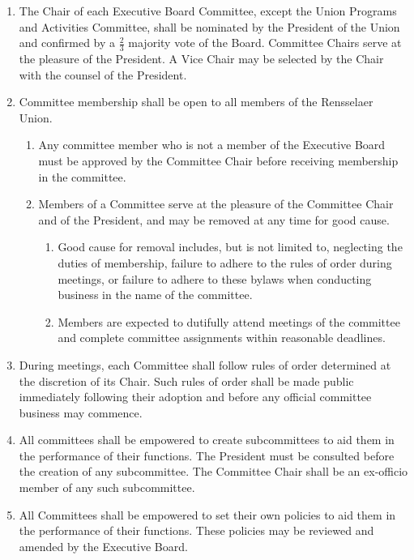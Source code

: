 \begin{enumerate}

    \item The Chair of each Executive Board Committee, except the Union Programs and Activities Committee, shall be nominated by the President of the Union and confirmed by a $\frac{2}{3}$ majority vote of the Board. Committee Chairs serve at the pleasure of the President. A Vice Chair may be selected by the Chair with the counsel of the President.

    \item Committee membership shall be open to all members of the Rensselaer Union.
    \begin{enumerate}
        \item Any committee member who is not a member of the Executive Board must be approved by the Committee Chair before receiving membership in the committee.
        \item Members of a Committee serve at the pleasure of the Committee Chair and of the President, and may be removed at any time for good cause.
        \begin{enumerate}
            \item Good cause for removal includes, but is not limited to, neglecting the duties of membership, failure to adhere to the rules of order during meetings, or failure to adhere to these bylaws when conducting business in the name of the committee.
            \item Members are expected to dutifully attend meetings of the committee and complete committee assignments within reasonable deadlines.
        \end{enumerate}
    \end{enumerate}
    
    \item During meetings, each Committee shall follow rules of order determined at the discretion of its Chair. Such rules of order shall be made public immediately following their adoption and before any official committee business may commence.

    \item All committees shall be empowered to create subcommittees to aid them in the performance of their functions. The President must be consulted before the creation of any subcommittee. The Committee Chair shall be an ex-officio member of any such subcommittee.

    \item All Committees shall be empowered to set their own policies to aid them in the performance of their functions. These policies may be reviewed and amended by the Executive Board.


\end{enumerate}
